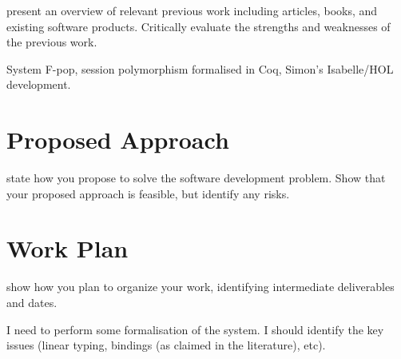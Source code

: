 \documentclass{mprop}
\begin{document}
present an overview of relevant previous work including articles, books, and
existing software products. Critically evaluate the strengths and weaknesses
of the previous work.

System F-pop, session polymorphism formalised in Coq, Simon's Isabelle/HOL
development.

\section{Proposed Approach}

state how you propose to solve the software development problem. Show that
your proposed approach is feasible, but identify any risks.

\section{Work Plan}

show how you plan to organize your work, identifying intermediate deliverables
and dates.

I need to perform some formalisation of the system. I should identify the key
issues (linear typing, bindings (as claimed in the literature), etc).


\printbibliography
\end{document}
